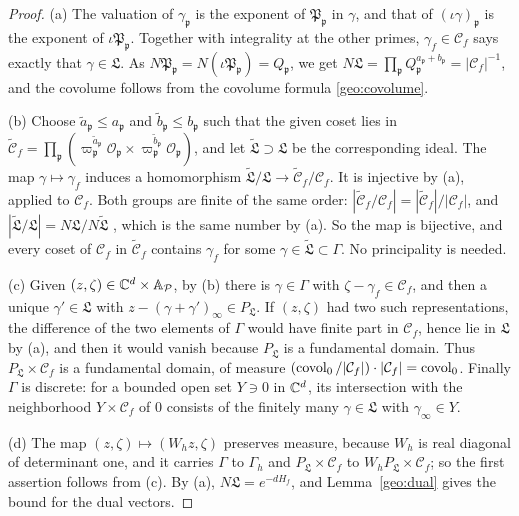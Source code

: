 \begin{proof}
(a) The valuation of $\gamma_{\mathfrak p}$ is the exponent of
$\mathfrak P_{\mathfrak p}$ in $\gamma$, and that of $(\iota\gamma)_{\mathfrak
p}$ is the exponent of $\iota\mathfrak P_{\mathfrak p}$. Together with
integrality at the other primes, $\gamma_f\in\mathcal C_f$ says exactly
that $\gamma\in\mathfrak L$. As $N\mathfrak P_{\mathfrak
p}=N(\iota\mathfrak P_{\mathfrak p})=Q_{\mathfrak p}$, we get
$N\mathfrak L=\prod_{\mathfrak p}Q_{\mathfrak p}^{a_{\mathfrak
p}+b_{\mathfrak p}}=|\mathcal C_f|^{-1}$, and the covolume follows from
the covolume formula \eqref{geo:covolume}.

(b) Choose $\tilde a_{\mathfrak p}\le a_{\mathfrak p}$ and $\tilde
b_{\mathfrak p}\le b_{\mathfrak p}$ such that the given coset lies in
$\tilde{\mathcal C}_f=\prod_{\mathfrak p}(\varpi_{\mathfrak p}^{\tilde
a_{\mathfrak p}}\mathcal O_{\mathfrak p}\times\varpi_{\mathfrak
p}^{\tilde b_{\mathfrak p}}\mathcal O_{\mathfrak p})$, and let
$\tilde{\mathfrak L}\supset\mathfrak L$ be the corresponding ideal. The
map $\gamma\mapsto\gamma_f$ induces a homomorphism $\tilde{\mathfrak
L}/\mathfrak L\to\tilde{\mathcal C}_f/\mathcal C_f$. It is injective by
(a), applied to $\mathcal C_f$. Both groups are finite of the same
order: $|\tilde{\mathcal C}_f/\mathcal C_f|=|\tilde{\mathcal
C}_f|/|\mathcal C_f|$, and $|\tilde{\mathfrak L}/\mathfrak L|=N\mathfrak
L/N\tilde{\mathfrak L}$ \cite[Proposition~4.2]{MilneANT}, which is the
same number by (a). So the map is bijective, and every coset of
$\mathcal C_f$ in $\tilde{\mathcal C}_f$ contains $\gamma_f$ for some
$\gamma\in\tilde{\mathfrak L}\subset\Gamma$. No principality is needed.

(c) Given $(z,\zeta)\in\mathbb C^d\times\mathbb A_{\mathcal P}$, by (b) there is
$\gamma\in\Gamma$ with $\zeta-\gamma_f\in\mathcal C_f$, and then a unique
$\gamma'\in\mathfrak L$ with $z-(\gamma+\gamma')_\infty\in P_{\mathfrak
L}$. If $(z,\zeta)$ had two such representations, the difference of the
two elements of $\Gamma$ would have finite part in $\mathcal C_f$, hence
lie in $\mathfrak L$ by (a), and then it would vanish because
$P_{\mathfrak L}$ is a fundamental domain. Thus
$P_{\mathfrak L}\times\mathcal C_f$ is a fundamental domain, of measure
$(\operatorname{covol}_0/|\mathcal C_f|)\cdot|\mathcal C_f|=\operatorname{covol}_0$. Finally $\Gamma$
is discrete: for a bounded open set $Y\ni0$ in $\mathbb C^d$, its intersection
with the neighborhood $Y\times\mathcal C_f$ of $0$ consists of the
finitely many $\gamma\in\mathfrak L$ with $\gamma_\infty\in Y$.

(d) The map $(z,\zeta)\mapsto(W_hz,\zeta)$ preserves measure, because
$W_h$ is real diagonal of determinant one, and it carries $\Gamma$ to
$\Gamma_h$ and $P_{\mathfrak L}\times\mathcal C_f$ to $W_hP_{\mathfrak
L}\times\mathcal C_f$; so the first assertion follows from (c). By (a),
$N\mathfrak L=e^{-dH_f}$, and Lemma~\ref{geo:dual} gives the bound for
the dual vectors.
\end{proof}

